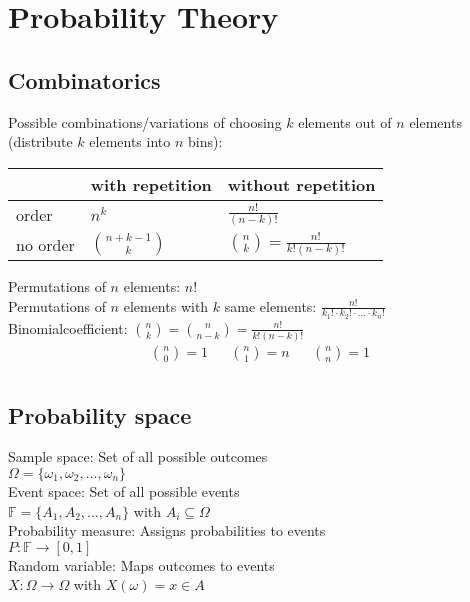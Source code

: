 \section{Probability Theory}
\begin{mdframed}[style=eqbox]
\subsection{Combinatorics}
Possible combinations/variations of choosing $k$ elements out of $n$ elements (distribute $k$ elements into $n$ bins):\\[0.25em]
\begin{tabularx}{\textwidth}{l|XX}
  \hline
  & with repetition & without repetition\\
  \hline
  order & $n^k$ & $\frac{n!}{(n-k)!}$\\[0.5em]
  no order & $\binom{n+k-1}{k}$ & $\binom{n}{k} = \frac{n!}{k!(n-k)!}$\\[0.5em]
  \hline
\end{tabularx}\vspace*{0.5em}
Permutations of $n$ elements: $n!$\\
Permutations of $n$ elements with $k$ same elements: $\frac{n!}{k_1! \cdot k_2! \cdot \ldots \cdot k_n!}$\\[0.25em]
Binomialcoefficient: $\binom{n}{k} = \binom{n}{n-k} = \frac{n!}{k!(n-k)!}$\\
\begin{align*}
  \binom{n}{0} = 1 & & \binom{n}{1} = n & & \binom{n}{n} = 1\\
\end{align*}
\end{mdframed}

\begin{mdframed}[style=eqbox]
\subsection{Probability space}
Sample space: Set of all possible outcomes\\
$\Omega = \{ \omega_1, \omega_2, \ldots, \omega_n \}$\\[0.25em]
Event space: Set of all possible events\\
$\mathbb{F} = \{ A_1, A_2, \ldots, A_n \}$ with $A_i \subseteq \Omega$\\[0.25em]
Probability measure: Assigns probabilities to events\\
$P : \mathbb{F} \rightarrow [0,1]$\\[0.25em]
Random variable: Maps outcomes to events\\
$X : \Omega \rightarrow \Omega$ with $X(\omega) = x \in A$\\[0.25em]
\end{mdframed}

